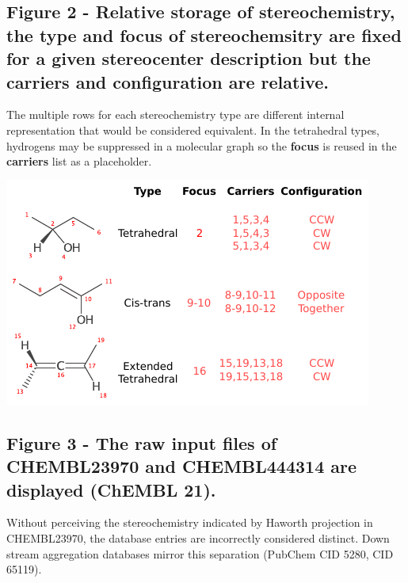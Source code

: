 \documentclass[10pt]{bmcart}
\begin{document}
\begin{backmatter}
\subsection*{Figure 2 - Relative storage of stereochemistry, the \textbf{type} and \textbf{focus} of stereochemsitry are fixed for a given stereocenter description but the \textbf{carriers} and \textbf{configuration} are relative.}\label{fig:stereodatastructure}
The multiple rows for each stereochemistry type are different internal representation that would be considered equivalent. In the tetrahedral types, hydrogens may be suppressed in a molecular graph so the \textbf{focus} is reused in the \textbf{carriers} list as a placeholder.

\includegraphics{img/stereodesc_annotated.pdf}

\subsection*{Figure 3 - The raw input files of CHEMBL23970 and CHEMBL444314 are displayed (ChEMBL 21).}\label{fig:stereoprojections}
Without perceiving the stereochemistry indicated by Haworth projection in CHEMBL23970, the database entries are incorrectly considered distinct. Down stream aggregation databases mirror this separation (PubChem CID 5280, CID 65119).


\end{backmatter}
\end{document}
